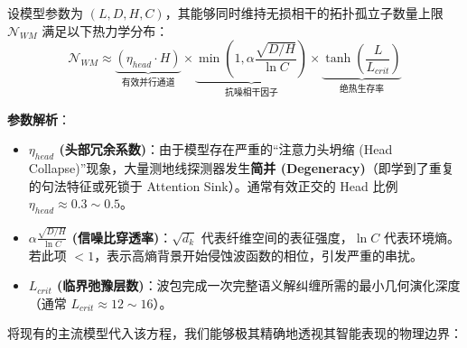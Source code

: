 \begin{theorem}
    设模型参数为 $(L, D, H, C)$，其能够同时维持无损相干的拓扑孤立子数量上限 $\mathcal{N}_{WM}$ 满足以下热力学分布：
    $$ \mathcal{N}_{WM} \approx \underbrace{\left( \eta_{head} \cdot H \right)}_{\text{有效并行通道}} \times \underbrace{\min \left( 1, \alpha \frac{\sqrt{D/H}}{\ln C} \right)}_{\text{抗噪相干因子}} \times \underbrace{\tanh\left(\frac{L}{L_{crit}}\right)}_{\text{绝热生存率}} $$
\end{theorem}

\textbf{参数解析}：
\begin{itemize}
    \item \textbf{$\eta_{head}$ (头部冗余系数)}：由于模型存在严重的“注意力头坍缩 (Head Collapse)”现象，大量测地线探测器发生\textbf{简并 (Degeneracy)}（即学到了重复的句法特征或死锁于 Attention Sink）。通常有效正交的 Head 比例 $\eta_{head} \approx 0.3 \sim 0.5$。
    \item \textbf{$\alpha \frac{\sqrt{D/H}}{\ln C}$ (信噪比穿透率)}：$\sqrt{d_k}$ 代表纤维空间的表征强度，$\ln C$ 代表环境熵。若此项 $< 1$，表示高熵背景开始侵蚀波函数的相位，引发严重的串扰。
    \item \textbf{$L_{crit}$ (临界弛豫层数)}：波包完成一次完整语义解纠缠所需的最小几何演化深度（通常 $L_{crit} \approx 12 \sim 16$）。
\end{itemize}


将现有的主流模型代入该方程，我们能够极其精确地透视其智能表现的物理边界：

